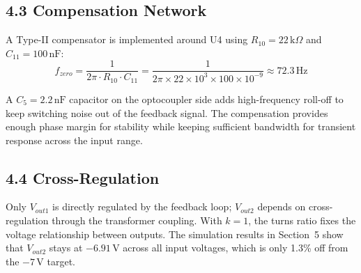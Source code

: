 \subsection*{4.3 Compensation Network}

A Type-II compensator is implemented around U4 using $R_{10} = 22\,\text{k}\Omega$ and $C_{11} = 100\,\text{nF}$:
\begin{equation}
f_{zero} = \frac{1}{2\pi \cdot R_{10} \cdot C_{11}} = \frac{1}{2\pi \times 22\times10^3 \times 100\times10^{-9}} \approx 72.3\,\text{Hz}
\end{equation}

A $C_5 = 2.2\,\text{nF}$ capacitor on the optocoupler side adds high-frequency roll-off to keep switching noise out of the feedback signal. The compensation provides enough phase margin for stability while keeping sufficient bandwidth for transient response across the input range.

\subsection*{4.4 Cross-Regulation}

Only $V_{out1}$ is directly regulated by the feedback loop; $V_{out2}$ depends on cross-regulation through the transformer coupling. With $k = 1$, the turns ratio fixes the voltage relationship between outputs. The simulation results in Section~5 show that $V_{out2}$ stays at $-6.91$\,V across all input voltages, which is only 1.3\% off from the $-7$\,V target.
